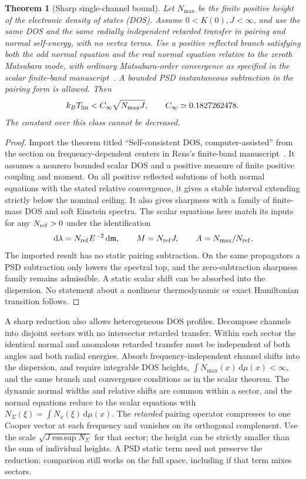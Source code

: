 \documentclass[11pt]{article}
\newtheorem{theorem}{Theorem}
\newcommand{\dd}{\,\mathrm{d}}
\newcommand{\Cinf}{C_\infty}
\newcommand{\Tlin}{T_{\rm lin}}
\begin{document}
\begin{theorem}[Sharp single-channel bound]
Let $N_{\max}$ be the finite positive height of the electronic density of states (DOS). Assume $0<K(0),J<\infty$, and use the same DOS and the same radially independent retarded transfer in pairing and normal self-energy, with no vertex terms. Use a positive reflected branch satisfying both the odd normal equation and the real normal equation relative to the zeroth Matsubara mode, with ordinary Matsubara-order convergence as specified in the scalar finite-band manuscript~\cite{finite}. A bounded PSD instantaneous subtraction in the pairing form is allowed. Then
\[
 k_B\Tlin<\Cinf\sqrt{N_{\max} J},\qquad \Cinf\simeq 0.1827262478.
\]
The constant over this class cannot be decreased.
\end{theorem}
\begin{proof}
Import the theorem titled ``Self-consistent DOS, computer-assisted'' from the section on frequency-dependent centers in Rens's finite-band manuscript~\cite{finite}. It assumes a nonzero bounded scalar DOS and a positive measure of finite positive coupling and moment. On all positive reflected solutions of both normal equations with the stated relative convergence, it gives a stable interval extending strictly below the nominal ceiling. It also gives sharpness with a family of finite-mass DOS and soft Einstein spectra. The scalar equations here match its inputs for any $N_{\rm ref}>0$ under the identification
\[
 \dd\lambda=N_{\rm ref}E^{-2}\dd\mathfrak m,\qquad
 M=N_{\rm ref}J,\qquad A=N_{\max}/N_{\rm ref}.
\]
The imported result has no static pairing subtraction. On the same propagators a PSD subtraction only lowers the spectral top, and the zero-subtraction sharpness family remains admissible. A static scalar shift can be absorbed into the dispersion. No statement about a nonlinear thermodynamic or exact Hamiltonian transition follows.
\end{proof}

A sharp reduction also allows heterogeneous DOS profiles. Decompose channels into disjoint sectors with no intersector retarded transfer. Within each sector the identical normal and anomalous retarded transfer must be independent of both angles and both radial energies. Absorb frequency-independent channel shifts into the dispersion, and require integrable DOS heights, $\int N_{\max}(x)\dd\mu(x)<\infty$, and the same branch and convergence conditions as in the scalar theorem. The dynamic normal widths and relative shifts are common within a sector, and the normal equations reduce to the scalar equations with $N_\Sigma(\xi)=\int N_x(\xi)\dd\mu(x)$. The \emph{retarded} pairing operator compresses to one Cooper vector at each frequency and vanishes on its orthogonal complement. Use the scale $\sqrt{J\operatorname{ess\,sup}N_\Sigma}$ for that sector; the height can be strictly smaller than the sum of individual heights. A PSD static term need not preserve the reduction: comparison still works on the full space, including if that term mixes sectors.
\end{document}
